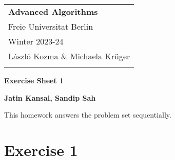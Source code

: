 \documentclass[a4paper,12pt]{article} %
\begin{document}



\thispagestyle{empty} %

\begin{tabular}{p{15.5cm}} %
{\large \bf Advanced Algorithms} \\
Freie Universitat Berlin \\ Winter 2023-24  \\ László Kozma \& Michaela Krüger\\
\hline %
\\
\end{tabular} %

\vspace*{0.3cm} %

\begin{center} %
	{\Large \bf Exercise Sheet 1} %
	\vspace{2mm}
	
	{\bf Jatin Kansal, Sandip Sah} %
		
\end{center}  

\vspace{0.4cm}



This homework answers the problem set sequentially. 

\section*{Exercise 1} 
\end{document}
